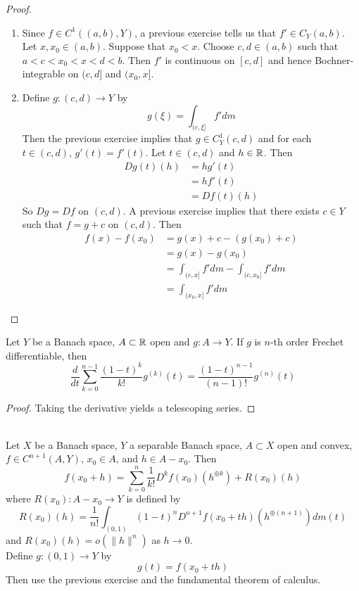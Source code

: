 \documentclass{book}
\begin{document}
	\begin{proof}\
	\begin{enumerate}
	\item Since $f \in C^1((a,b), Y)$, a previous exercise tells us that $f' \in C_Y(a,b)$. Let $x, x_0 \in (a,b)$. Suppose that $x_0 < x$. Choose $c,d \in (a,b)$ such that $a < c < x_0< x< d < b$. Then $f'$ is continuous on $[c,d]$ and hence Bochner-integrable on $(c,d]$ and $(x_0,x]$. 
	\item Define $g: (c,d) \rightarrow Y$ by $$g(\xi) = \int_{(c, \xi]}f'dm$$
	Then the previous exercise implies that $g \in C^1_Y(c,d)$ and for each $t \in (c, d)$, $g'(t) = f'(t)$. Let $t \in (c,d)$ and $h \in \mathbb{R}$. Then
	\begin{align*}
	Dg(t)(h) 
	&= hg'(t) \\
	&= hf'(t) \\
	&= Df(t)(h)
	\end{align*}
	So $Dg = Df$ on $(c,d)$. A previous exercise implies that there exists $c \in Y$ such that $f = g + c$ on $(c, d)$. Then 
	\begin{align*}
	f(x) - f(x_0)
	&= g(x)+c - (g(x_0)+c) \\
	&= g(x) - g(x_0) \\
	&= \int_{(c, x]}f'dm - \int_{(c, x_0]}f'dm\\
	&= \int_{(x_0, x]}f'dm
	\end{align*}
	\end{enumerate}
	\end{proof}
	
	
	\begin{ex} \lex{}
	Let $Y$ be a Banach space, $A \subset \mathbb{R}$ open and $g:A \rightarrow Y$. If $g$ is $n$-th order Frechet differentiable, then 
	$$\frac{d}{dt} \sum_{k=0}^{n-1} \frac{(1-t)^k}{k!}g^{(k)}(t) = \frac{(1-t)^{n-1}}{(n-1)!}g^{(n)}(t)$$
	\end{ex}
	
	\begin{proof}
	Taking the derivative yields a telescoping series.
	\end{proof}
	
	
	
	\begin{ex} \lex{} \\
	Let $X$ be a Banach space, $Y$ a separable Banach space, $A \subset X$ open and convex, $f\in C^{n+1}(A, Y)$, $x_0 \in A$, and $h \in A - x_0$. Then $$f(x_0 + h) = \sum_{k=0}^{n} \frac{1}{k!} D^k f(x_0)(h^{\oplus k}) + R(x_0)(h)$$ 
	where $R(x_0): A - x_0 \rightarrow Y$ is defined by $$R(x_0)(h) = \frac{1}{n!}\int_{(0,1)} (1-t)^{n}D^{n+1}f(x_0 + th)(h^{\oplus (n+1)})d m(t)$$
	and $R(x_0)(h) = o(\|h\|^{n})$ as $h \rightarrow 0$.\\
	 Define $g: (0,1) \rightarrow Y$ by $$g(t) = f(x_0 +t h)$$ Then use the previous exercise and the fundamental theorem of calculus.
	\end{ex}
	
\end{document}
